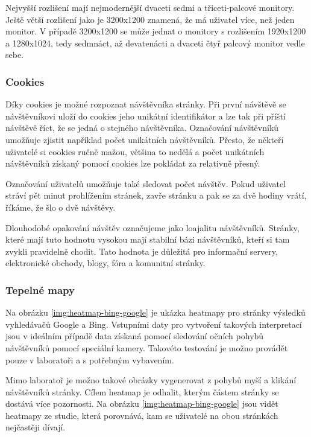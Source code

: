 \documentclass[bc,male,java,dept456]{diploma}						%
\begin{document}
Nejvyšší rozlišení mají nejmodernější dvaceti sedmi a třiceti-palcové monitory. Ještě větší rozlišení jako je 3200x1200 znamená, že má uživatel více, než jeden monitor. V případě 3200x1200 se může jednat o monitory s rozlišením 1920x1200 a 1280x1024, tedy sedmnáct, až devatenácti a dvaceti čtyř palcový monitor vedle sebe.





\subsubsection{Cookies}

Díky cookies\cite{cookies} je možné rozpoznat návštěvníka stránky. Při první návštěvě se ná\-vště\-vní\-ko\-vi uloží do cookies jeho unikátní identifikátor a lze tak při příští návštěvě říct, že se jedná o stejného návštěvníka. Označování návštěvníků umožňuje zjistit například počet uni\-kát\-ních návštěvníků. Přesto, že někteří uživatelé si cookies ručně mažou, většina to nedělá a počet unikátních návštěvníků získaný pomocí cookies lze pokládat za relativně přesný.

Označování uživatelů umožňuje také sledovat počet návštěv. Pokud uživatel stráví pět minut prohlížením stránek, zavře stránku a pak se za dvě hodiny vrátí, říkáme, že šlo o dvě návštěvy.

Dlouhodobé opakování návštěv označujeme jako loajalitu návštěvníků. Stránky, které mají tuto hodnotu vysokou mají stabilní bázi návštěvníků, kteří si tam zvykli pravidelně chodit. Tato hodnota je důležitá pro informační servery, elektronické obchody, blogy, fóra a komunitní stránky.





\subsubsection{Tepelné mapy}

Na obrázku \ref{img:heatmap-bing-google} je ukázka heatmapy pro stránky výsledků vyhledávačů Google a Bing. Vstupními daty pro vytvoření takových interpretací jsou v ideálním případě data získaná pomocí sledování očních pohybů návštěvníků pomocí speciální kamery. Takovéto tes\-to\-vá\-ní je možno provádět pouze v laboratoři a s potřebným vybavením.

Mimo laboratoř je možno takové obrázky vygenerovat z pohybů myší a klikání ná\-vště\-vní\-ků stránky. Cílem heatmap je odhalit, kterým částem stránky se dostává více pozornosti. Na obrázku \ref{img:heatmap-bing-google} jsou vidět heatmapy ze studie\cite{heatmap}, která porovnává, kam se uživatelé na obou stránkách nejčastěji dívají.
\end{document}
